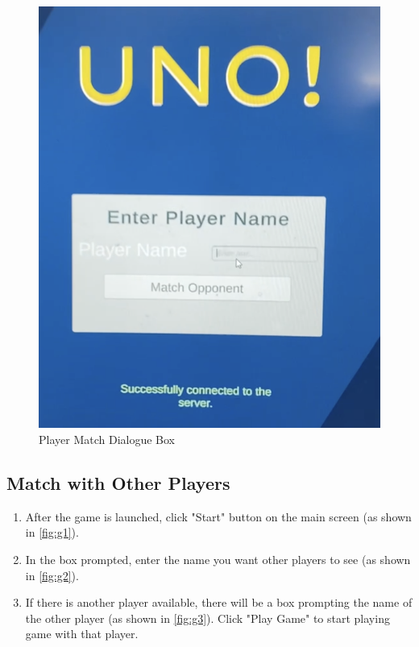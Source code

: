 \documentclass[12pt, titlepage]{article}
\begin{document}
\begin{figure}[h]
    \centering
    \includegraphics[scale=0.3]{Player_match.png}
    \caption{Player Match Dialogue Box}
    \label{fig:g2}
\end{figure}

\subsection{Match with Other Players}
\begin{enumerate}
    \item After the game is launched, click "Start" button on the main screen (as shown in \autoref{fig:g1}).
    \item In the box prompted, enter the name you want other players to see (as shown in \autoref{fig:g2}).
    \item If there is another player available, there will be a box prompting the name of the other player (as shown in \autoref{fig:g3}). Click "Play Game" to start playing game with that player.
\end{enumerate}
\end{document}
